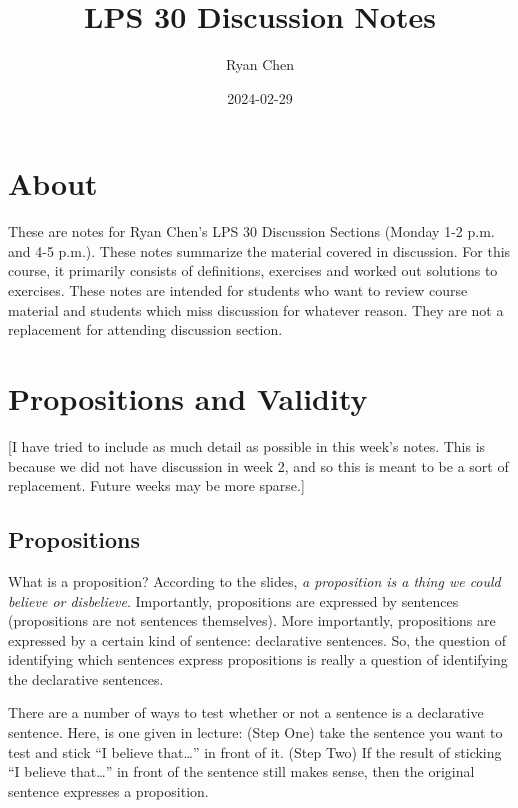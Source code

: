 \documentclass[
]{book}
\title{LPS 30 Discussion Notes}
\author{Ryan Chen}
\date{2024-02-29}
\begin{document}
\maketitle

{
\setcounter{tocdepth}{1}
\tableofcontents
}
\hypertarget{about}{%
\chapter{About}\label{about}}

These are notes for Ryan Chen's LPS 30 Discussion Sections (Monday 1-2 p.m. and 4-5 p.m.). These notes summarize the material covered in discussion. For this course, it primarily consists of definitions, exercises and worked out solutions to exercises. These notes are intended for students who want to review course material and students which miss discussion for whatever reason. They are not a replacement for attending discussion section.

\hypertarget{propositions-and-validity}{%
\chapter{Propositions and Validity}\label{propositions-and-validity}}

{[}I have tried to include as much detail as possible in this week's notes. This is because we did not have discussion in week 2, and so this is meant to be a sort of replacement. Future weeks may be more sparse.{]}

\hypertarget{propositions}{%
\section{Propositions}\label{propositions}}

What is a proposition? According to the slides, \emph{a proposition is a thing we could believe or disbelieve}. Importantly, propositions are expressed by sentences (propositions are not sentences themselves). More importantly, propositions are expressed by a certain kind of sentence: declarative sentences. So, the question of identifying which sentences express propositions is really a question of identifying the declarative sentences.

There are a number of ways to test whether or not a sentence is a declarative sentence. Here, is one given in lecture: (Step One) take the sentence you want to test and stick ``I believe that\ldots{}'' in front of it. (Step Two) If the result of sticking ``I believe that\ldots{}'' in front of the sentence still makes sense, then the original sentence expresses a proposition.
\end{document}
